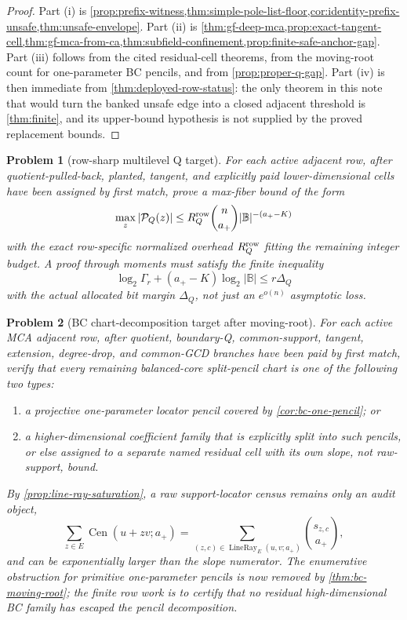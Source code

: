 \documentclass[a4paper,11pt]{amsart}
\newtheorem{problem}[problem]{Problem}
\theoremstyle{remark}
\newcommand{\B}{\mathbb B}
\newcommand{\Cen}{\operatorname{Cen}}
\newcommand{\LineRay}{\operatorname{LineRay}}
\begin{document}
\begin{proof}
Part (i) is \cref{prop:prefix-witness,thm:simple-pole-list-floor,cor:identity-prefix-unsafe,thm:unsafe-envelope}.  Part (ii) is \cref{thm:gf-deep-mca,prop:exact-tangent-cell,thm:gf-mca-from-ca,thm:subfield-confinement,prop:finite-safe-anchor-gap}.  Part (iii) follows from the cited residual-cell theorems, from the moving-root count for one-parameter BC pencils, and from \cref{prop:proper-q-gap}.  Part (iv) is then immediate from \cref{thm:deployed-row-status}: the only theorem in this note that would turn the banked unsafe edge into a closed adjacent threshold is \cref{thm:finite}, and its upper-bound hypothesis is not supplied by the proved replacement bounds.
\end{proof}

\begin{problem}[row-sharp multilevel Q target]\label{prob:row-sharp-q}
For each active adjacent row, after quotient-pulled-back, planted, tangent, and explicitly paid lower-dimensional cells have been assigned by first match, prove a max-fiber bound of the form
\[
        \max_z |\mathcal P_Q(z)|
        \le
        R_Q^{\rm row}\binom n{a_+}|\B|^{-(a_+-K)}
\]
with the exact row-specific normalized overhead \(R_Q^{\rm row}\) fitting the remaining integer budget.  A proof through moments must satisfy the finite inequality
\[
        \log_2\Gamma_r+(a_+-K)\log_2|\B|\le r\Delta_Q
\]
with the actual allocated bit margin \(\Delta_Q\), not just an \(e^{o(n)}\) asymptotic loss.
\end{problem}

\begin{problem}[BC chart-decomposition target after moving-root]\label{prob:saturated-bc}
For each active MCA adjacent row, after quotient, boundary-Q, common-support, tangent, extension, degree-drop, and common-GCD branches have been paid by first match, verify that every remaining balanced-core split-pencil chart is one of the following two types:
\begin{enumerate}[label=\textup{(\alph*)}]
\item a projective one-parameter locator pencil covered by \cref{cor:bc-one-pencil}; or
\item a higher-dimensional coefficient family that is explicitly split into such pencils, or else assigned to a separate named residual cell with its own slope, not raw-support, bound.
\end{enumerate}
By \cref{prop:line-ray-saturation}, a raw support-locator census remains only an audit object,
\[
        \sum_{z\in E}\Cen(u+zv;a_+)
        =
        \sum_{(z,c)\in\LineRay_E(u,v;a_+)}\binom{s_{z,c}}{a_+},
\]
and can be exponentially larger than the slope numerator.  The enumerative obstruction for primitive one-parameter pencils is now removed by \cref{thm:bc-moving-root}; the finite row work is to certify that no residual high-dimensional BC family has escaped the pencil decomposition.
\end{problem}
\end{document}
